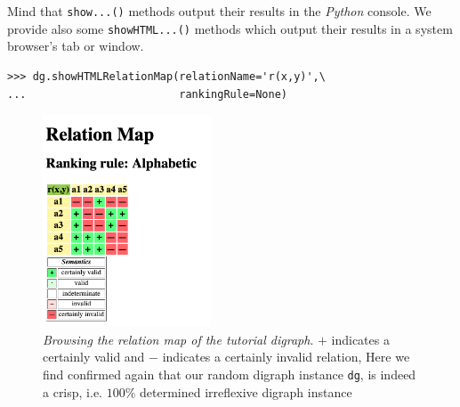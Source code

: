 Mind that \texttt{show...()} methods output their results in the \emph{Python} console. We provide also some \texttt{showHTML...()} methods which output their results in a system browser’s tab or window.
\begin{lstlisting}
>>> dg.showHTMLRelationMap(relationName='r(x,y)',\
...                        rankingRule=None)
\end{lstlisting}
\begin{figure}[ht]
\sidecaption[t]
\includegraphics[width=5cm]{Figures/1-2-relationMap1.png}
\caption[Browsing the relation map of the tutorial digraph]{\emph{Browsing the relation map of the tutorial digraph}. $+$ indicates a certainly valid and $-$ indicates a certainly  invalid relation, Here we find confirmed again that our random digraph instance \texttt{dg}, is indeed a crisp, i.e. $100\%$ determined irreflexive digraph instance}
\label{fig:1.2}       %
\end{figure}


